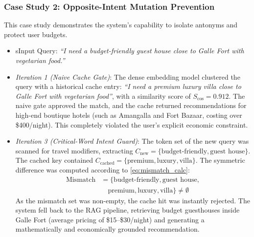 \documentclass{ieeeaccess}
\begin{document}
\subsubsection{Case Study 2: Opposite-Intent Mutation Prevention}
This case study demonstrates the system's capability to isolate antonyms and protect user budgets.
\begin{itemize}
    \item s{Input Query}: \emph{``I need a budget-friendly guest house close to Galle Fort with vegetarian food.''}
    \item \emph{Iteration 1 (Naive Cache Gate)}: The dense embedding model clustered the query with a historical cache entry: \emph{``I need a premium luxury villa close to Galle Fort with vegetarian food''}, with a similarity score of $S_{\text{cos}} = 0.912$. The naive gate approved the match, and the cache returned recommendations for high-end boutique hotels (such as Amangalla and Fort Bazaar, costing over \$400/night). This completely violated the user's explicit economic constraint.
    \item \emph{Iteration 3 (Critical-Word Intent Guard)}: The token set of the new query was scanned for travel modifiers, extracting $C_{\text{new}} = \{\text{budget-friendly}, \text{guest house}\}$. The cached key contained $C_{\text{cached}} = \{\text{premium}, \text{luxury}, \text{villa}\}$. The symmetric difference was computed according to \eqref{eq:mismatch_calc}:
    \begin{equation}
\label{eq:mismatch_calc}
\begin{split}
\text{Mismatch} &= \{\text{budget-friendly}, \text{guest house}, \\
&\quad \text{premium}, \text{luxury}, \text{villa}\} \neq \emptyset
\end{split}
\end{equation}
     As the mismatch set was non-empty, the cache hit was instantly rejected. The system fell back to the RAG pipeline, retrieving budget guesthouses inside Galle Fort (average pricing of \$15–\$30/night) and generating a mathematically and economically grounded recommendation.
\end{itemize}
\end{document}
